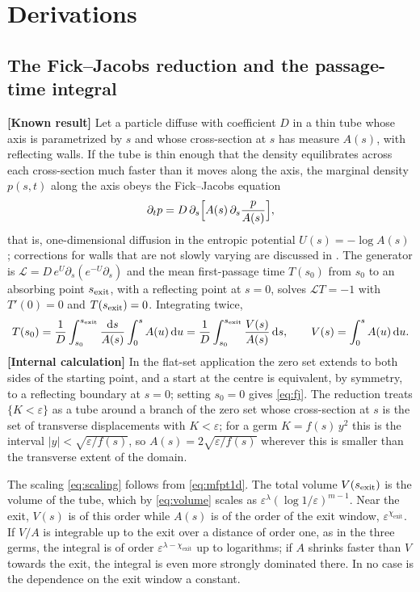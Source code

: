\documentclass[11pt,a4paper]{article}
\newcommand{\eps}{\varepsilon}
\newcommand{\dd}{\mathrm d}
\newcommand{\chiexit}{\chi_{\mathrm{exit}}}
\newcommand{\evl}[2]{{\small\bfseries\color{#1}[#2]}}
\newcommand{\LKnown}{\evl{cknown}{Known result}}
\newcommand{\LCalc}{\evl{ccalc}{Internal calculation}}
\begin{document}
\appendix
\renewcommand{\theequation}{A.\arabic{equation}}
\setcounter{equation}{0}

\section{Derivations}
\label{app:derivations}

\subsection{The Fick--Jacobs reduction and the passage-time integral}
\label{app:fj}

\LKnown{} Let a particle diffuse with coefficient $D$ in a thin tube whose
axis is parametrized by $s$ and whose cross-section at $s$ has measure
$A(s)$, with reflecting walls. If the tube is thin enough that the density
equilibrates across each cross-section much faster than it moves along the
axis, the marginal density $p(s,t)$ along the axis obeys the Fick--Jacobs
equation
\begin{equation}
\partial_tp=D\,\partial_s\Bigl[A(s)\,\partial_s\frac{p}{A(s)}\Bigr],
\label{eq:fjpde}
\end{equation}
that is, one-dimensional diffusion in the entropic potential
$U(s)=-\log A(s)$ \cite{zwanzig1992}; corrections for walls that are not
slowly varying are discussed in \cite{reguera2001}. The generator is
$\mathcal L=D\,e^{U}\partial_s(e^{-U}\partial_s)$ and the mean first-passage
time $T(s_0)$ from $s_0$ to an absorbing point $s_{\rm exit}$, with a
reflecting point at $s=0$, solves $\mathcal LT=-1$ with $T'(0)=0$ and
$T(s_{\rm exit})=0$. Integrating twice,
\begin{equation}
T(s_0)=\frac1D\int_{s_0}^{s_{\rm exit}}\frac{\dd s}{A(s)}\int_0^{s}A(u)\,\dd u
=\frac1D\int_{s_0}^{s_{\rm exit}}\frac{V(s)}{A(s)}\,\dd s,
\qquad V(s)=\int_0^sA(u)\,\dd u.
\label{eq:mfpt1d}
\end{equation}
\LCalc{} In the flat-set application the zero set extends to both sides of
the starting point, and a start at the centre is equivalent, by symmetry, to
a reflecting boundary at $s=0$; setting $s_0=0$ gives \eqref{eq:fj}. The
reduction treats $\{K<\eps\}$ as a tube around a branch of the zero set
whose cross-section at $s$ is the set of transverse displacements with
$K<\eps$; for a germ $K=f(s)\,y^2$ this is the interval
$|y|<\sqrt{\eps/f(s)}$, so $A(s)=2\sqrt{\eps/f(s)}$ wherever this is
smaller than the transverse extent of the domain.

The scaling \eqref{eq:scaling} follows from \eqref{eq:mfpt1d}. The total
volume $V(s_{\rm exit})$ is the volume of the tube, which by
\eqref{eq:volume} scales as $\eps^\lambda(\log1/\eps)^{m-1}$. Near the
exit, $V(s)$ is of this order while $A(s)$ is of the order of the exit
window, $\eps^{\chiexit}$. If $V/A$ is integrable up to the exit over a
distance of order one, as in the three germs, the integral is of order
$\eps^{\lambda-\chiexit}$ up to logarithms; if $A$ shrinks faster than $V$
towards the exit, the integral is even more strongly dominated there. In no
case is the dependence on the exit window a constant.
\end{document}
